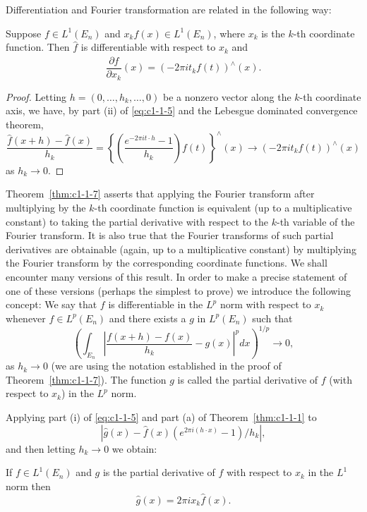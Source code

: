 Differentiation and Fourier transformation are related in the following way:

\begin{theorem}\label{thm:c1-1-7}
Suppose $f \in L^{1}(E_{n})$ and $x_{k} f(x) \in L^{1}(E_{n})$, where $x_{k}$ is
the $k$-th coordinate function. Then $\hat{f}$ is differentiable with respect to
$x_{k}$ and
\[
\frac{\partial\hat{f}}{\partial x_{k}}(x)=(-2\pi i t_{k}f(t))^{\wedge}(x).
\]
\end{theorem}

\begin{proof}
Letting $h = (0, \ldots, h_{k}, \ldots, 0)$ be a nonzero vector along the
$k$-th coordinate axis, we have, by part (ii) of \eqref{eq:c1-1-5} and the
Lebesgue dominated convergence theorem,
\[
\frac{\hat{f}(x+h)-\hat{f}(x)}{h_{k}}
=\left\{\left(\frac{e^{-2\pi i t\cdot h}-1}{h_{k}}\right)f(t)\right\}^{\wedge}(x)
\to(-2\pi i t_{k}f(t))^{\wedge}(x)
\]
as $h_{k} \to 0$.
\end{proof}

Theorem~\ref{thm:c1-1-7} asserts that applying the Fourier transform after
multiplying by the $k$-th coordinate function is equivalent (up to a
multiplicative constant) to taking the partial derivative with respect to the
$k$-th variable of the Fourier transform. It is also true that the Fourier
transforms of such partial derivatives are obtainable (again, up to a
multiplicative constant) by multiplying the Fourier transform by the
corresponding coordinate functions. We shall encounter many versions of this
result. In order to make a precise statement of one of these versions (perhaps
the simplest to prove) we introduce the following concept: We say that $f$ is
differentiable in the $L^{p}$ norm with respect to $x_{k}$ whenever
$f \in L^{p}(E_{n})$ and there exists a $g$ in $L^{p}(E_{n})$ such that
\[
\left(\int_{E_{n}}\left|\frac{f(x+h)-f(x)}{h_{k}}-g(x)\right|^{p}dx\right)^{1/p}\to0,
\]
as $h_{k} \to 0$ (we are using the notation established in the proof of
Theorem~\ref{thm:c1-1-7}). The function $g$ is called the partial derivative of
$f$ (with respect to $x_{k}$) in the $L^{p}$ norm.

Applying part (i) of \eqref{eq:c1-1-5} and part (a) of
Theorem~\ref{thm:c1-1-1} to
\[
|\hat{g}(x)-\hat{f}(x)(e^{2\pi i(h\cdot x)}-1)/h_{k}|,
\]
and then letting $h_{k} \to 0$ we obtain:

\begin{theorem}\label{thm:c1-1-8}
If $f \in L^{1}(E_{n})$ and $g$ is the partial derivative of $f$ with respect to
$x_{k}$ in the $L^{1}$ norm then
\[
\hat{g}(x)=2\pi i x_{k}\hat{f}(x).
\]
\end{theorem}

